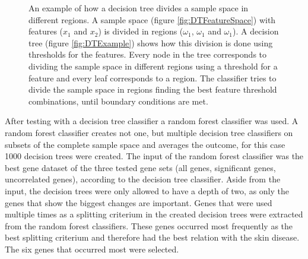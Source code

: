 \documentclass[10pt,a4paper]{article}
\begin{document}
		\begin{figure}[H]
		\centering
		\hfill
		\caption{An example of how a decision tree divides a sample space in different regions. A sample space (figure \ref{fig:DTFeatureSpace}) with features ($x_1$ and $x_2$) is divided in regions ($\omega_1$, $\omega_1$ and $\omega_1$). A decision tree (figure \ref{fig:DTExample}) shows how this division is done using thresholds for the features. Every node in the tree corresponds to dividing the sample space in different regions using a threshold for a feature and every leaf corresponds to a region. The classifier tries to divide the sample space in regions finding the best feature threshold combinations, until boundary conditions are met.}
		\label{fig:DecisionTree}
	\end{figure}
	
	After testing with a decision tree classifier a random forest classifier was used. A random forest classifier creates not one, but multiple decision tree classifiers on subsets of the complete sample space and averages the outcome, for this case 1000 decision trees were created. The input of the random forest classifier was the best gene dataset of the three tested gene sets (all genes, significant genes, uncorrelated genes), according to the decision tree classifier. Aside from the input, the decision trees were only allowed to have a depth of two, as only the genes that show the biggest changes are important. Genes that were used multiple times as a splitting criterium in the created decision trees were extracted from the random forest classifiers. These genes occurred most frequently as the best splitting criterium and therefore had the best relation with the skin disease. The six genes that occurred most were selected.
	
\end{document}
